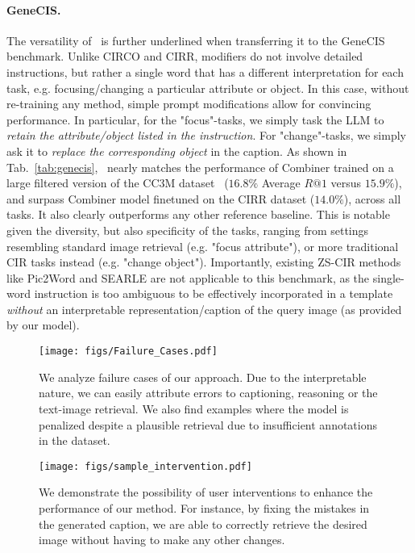 \documentclass{article} \usepackage{iclr2024_conference,times}
\begin{document}
\paragraph{GeneCIS.} The versatility of \methodNameNS\ is further underlined when transferring it to the GeneCIS benchmark.
Unlike CIRCO and CIRR, modifiers do not involve detailed instructions, but rather a single word that has a different interpretation for each task, e.g. focusing/changing a particular attribute or object. In this case, without re-training any method, simple prompt modifications allow for convincing performance. In particular, for the "focus"-tasks, we simply task the LLM to \textit{retain the attribute/object listed in the instruction}. For "change"-tasks, we simply ask it to \textit{replace the corresponding object} in the caption.
As shown in Tab.~\ref{tab:genecis}, \methodNameNS\ nearly matches the performance of Combiner trained on a large filtered version of the CC3M dataset~\citep{cc3m} ($16.8\%$ Average $R@1$ versus $15.9\%$), and surpass Combiner model finetuned on the CIRR dataset ($14.0\%$), across all tasks. It also clearly outperforms any other reference baseline.
This is notable given the diversity, but also specificity of the tasks, ranging from settings resembling standard image retrieval (e.g. "focus attribute"), or more traditional CIR tasks instead (e.g. "change object").
Importantly, existing ZS-CIR methods like Pic2Word and SEARLE are not applicable to this benchmark, as the single-word instruction is too ambiguous to be effectively incorporated in a template \textit{without} an interpretable representation/caption of the query image (as provided by our model). 

\begin{figure}[t]
    \centering
    \texttt{[image: figs/Failure\_Cases.pdf]}
    \caption{We analyze failure cases of our approach. Due to the interpretable nature, we can easily attribute errors to captioning, reasoning or the text-image retrieval. We also find examples where the model is penalized despite a plausible retrieval due to insufficient annotations in the dataset.}
    \label{fig:failure}
\end{figure} \begin{figure}[t]
     \centering
     \texttt{[image: figs/sample\_intervention.pdf]}
     \vspace{-5pt}
\caption{We demonstrate the possibility of user interventions to enhance the performance of our method. For instance, by fixing the mistakes in the generated caption, we are able to correctly retrieve the desired image without having to make any other changes.}
\vspace{-5pt}
\label{fig:intervention}
\end{figure} 
\end{document}
